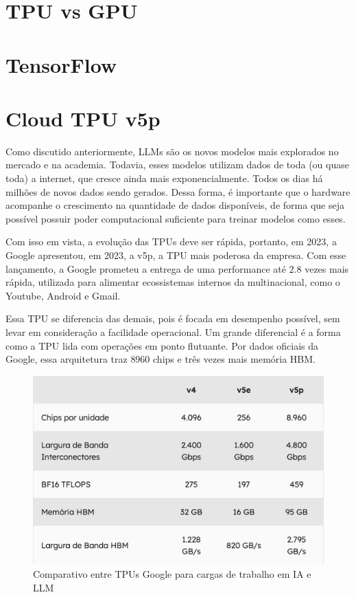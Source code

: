 \documentclass{report}
\begin{document}
\chapter{TPU vs GPU}

\chapter{TensorFlow}

\chapter{Cloud TPU v5p}

Como discutido anteriormente, LLMs são os novos modelos mais explorados no mercado e na academia. Todavia, esses modelos utilizam dados de toda (ou quase toda) a internet, que cresce ainda mais exponencialmente. Todos os dias há milhões de novos dados sendo gerados. Dessa forma, é importante que o hardware acompanhe o crescimento na quantidade de dados disponíveis, de forma que seja possível possuir poder computacional suficiente para treinar modelos como esses.

Com isso em vista, a evolução das TPUs deve ser rápida, portanto, em 2023, a Google apresentou, em 2023, a v5p, a TPU mais poderosa da empresa. Com esse lançamento, a Google prometeu a entrega de uma performance até $2.8$ vezes mais rápida, utilizada para alimentar ecossistemas internos da multinacional, como o Youtube, Android e Gmail.

Essa TPU se diferencia das demais, pois é focada em desempenho possível, sem levar em consideração a facilidade operacional. Um grande diferencial é a forma como a TPU lida com operações em ponto flutuante. Por dados oficiais da Google, essa arquitetura traz $8960$ chips e três vezes mais memória HBM.

\begin{figure}[h]
\includegraphics[scale=0.7]{comparativo-tpus}
\centering
\caption{Comparativo entre TPUs Google para cargas de trabalho em IA e LLM}
\end{figure}
\end{document}

